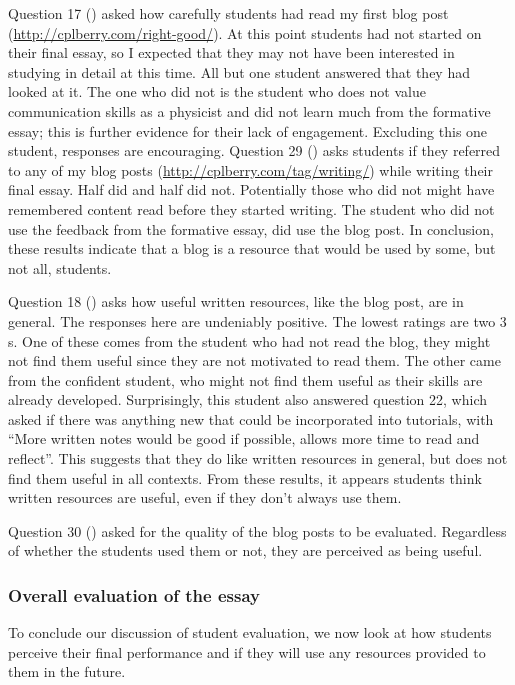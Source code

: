 Question 17 () asked how carefully students had read my first blog post (\url{http://cplberry.com/right-good/}). At this point students had not started on their final essay, so I expected that they may not have been interested in studying in detail at this time. All but one student answered that they had looked at it. The one who did not is the student who does not value communication skills as a physicist and did not learn much from the formative essay; this is further evidence for their lack of engagement. Excluding this one student, responses are encouraging. Question 29 () asks students if they referred to any of my blog posts (\url{http://cplberry.com/tag/writing/}) while writing their final essay. Half did and half did not. Potentially those who did not might have remembered content read before they started writing. The student who did not use the feedback from the formative essay, did use the blog post. In conclusion, these results indicate that a blog is a resource that would be used by some, but not all, students.

Question 18 () asks how useful written resources, like the blog post, are in general. The responses here are undeniably positive. The lowest ratings are two $3$s. One of these comes from the student who had not read the blog, they might not find them useful since they are not motivated to read them. The other came from the confident student, who might not find them useful as their skills are already developed. Surprisingly, this student also answered question 22, which asked if there was anything new that could be incorporated into tutorials, with ``More written notes would be good if possible, allows more time to read and reflect''. This suggests that they do like written resources in general, but does not find them useful in all contexts. From these results, it appears students think written resources are useful, even if they don't always use them.

Question 30 () asked for the quality of the blog posts to be evaluated. Regardless of whether the students used them or not, they are perceived as being useful.

\subsubsection{Overall evaluation of the essay}\label{sec:views-essay}

To conclude our discussion of student evaluation, we now look at how students perceive their final performance and if they will use any resources provided to them in the future.

